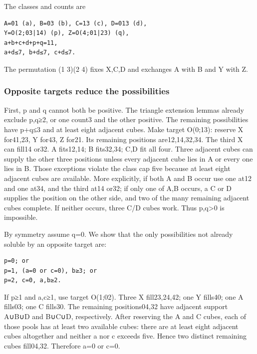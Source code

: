 \documentclass[
  10pt,
]{article}
\begin{document}
The classes and counts are

\begin{verbatim}
A=01 (a), B=03 (b), C=13 (c), D=013 (d),
Y=O(2;03|14) (p), Z=O(4;01|23) (q),
a+b+c+d+p+q=11,
a+d≤7, b+d≤7, c+d≤7.
\end{verbatim}

The permutation (1 3)(2 4) fixes X,C,D and exchanges A with B and Y with
Z.

\hypertarget{opposite-targets-reduce-the-possibilities}{%
\subsubsection*{Opposite targets reduce the
possibilities}\label{opposite-targets-reduce-the-possibilities}}

First, p and q cannot both be positive. The triangle extension lemmas
already exclude p,q≥2, or one count3 and the other positive. The
remaining possibilities have p+q≤3 and at least eight adjacent cubes.
Make target O(0;13): reserve X for41,23, Y for43, Z for21. Its
remaining positions are12,14,32,34. The third X can fill14 or32. A
fits12,14; B fits32,34; C,D fit all four. Three adjacent cubes can
supply the other three positions unless every adjacent cube lies in A or
every one lies in B. Those exceptions violate the class cap five because
at least eight adjacent cubes are available. More explicitly, if both A
and B occur use one at12 and one at34, and the third at14 or32; if only
one of A,B occurs, a C or D supplies the position on the other side, and
two of the many remaining adjacent cubes complete. If neither occurs,
three C/D cubes work. Thus p,q\textgreater0 is impossible.

By symmetry assume q=0. We show that the only possibilities not already
soluble by an opposite target are:

\begin{verbatim}
p=0; or
p=1, (a=0 or c=0), b≥3; or
p=2, c=0, a,b≥2.
\end{verbatim}

If p≥1 and a,c≥1, use target O(1;02). Three X fill23,24,42;
one Y fills40; one A fills03; one C fills30. The remaining
positions04,32 have adjacent support A∪B∪D and B∪C∪D, respectively.
After reserving the A and C cubes, each of those pools has at least two
available cubes: there are at least eight adjacent cubes altogether and
neither a nor c exceeds five. Hence two distinct remaining cubes
fill04,32. Therefore a=0 or c=0.
\end{document}
